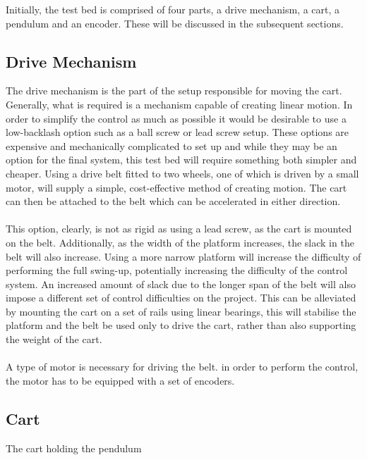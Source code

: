 Initially, the test bed is comprised of four parts, a drive mechanism, a cart, a pendulum and an encoder.
These will be discussed in the subsequent sections.

\subsection{Drive Mechanism} %
\label{sub:drive_mechanism}
The drive mechanism is the part of the setup responsible for moving the cart.
Generally, what is required is a mechanism capable of creating linear motion.
In order to simplify the control as much as possible it would be desirable to use a low-backlash option such as a ball screw or lead screw setup.
These options are expensive and mechanically complicated to set up and while they may be an option for the final system, this test bed will require something both simpler and cheaper.
Using a drive belt fitted to two wheels, one of which is driven by a small motor, will supply a simple, cost-effective method of creating motion.
The cart can then be attached to the belt which can be accelerated in either direction.
\\~\\
This option, clearly, is not as rigid as using a lead screw, as the cart is mounted on the belt.
Additionally, as the width of the platform increases, the slack in the belt will also increase.
Using a more narrow platform will increase the difficulty of performing the full swing-up, potentially increasing the difficulty of the control system.
An increased amount of slack due to the longer span of the belt will also impose a different set of control difficulties on the project.
This can be alleviated by mounting the cart on a set of rails using linear bearings, this will stabilise the platform and the belt be used only to drive the cart, rather than also supporting the weight of the cart.
\\~\\
A type of motor is necessary for driving the belt.
in order to perform the control, the motor has to be equipped with a set of encoders.

\subsection{Cart} %
\label{sub:cart}
The cart holding the pendulum 
